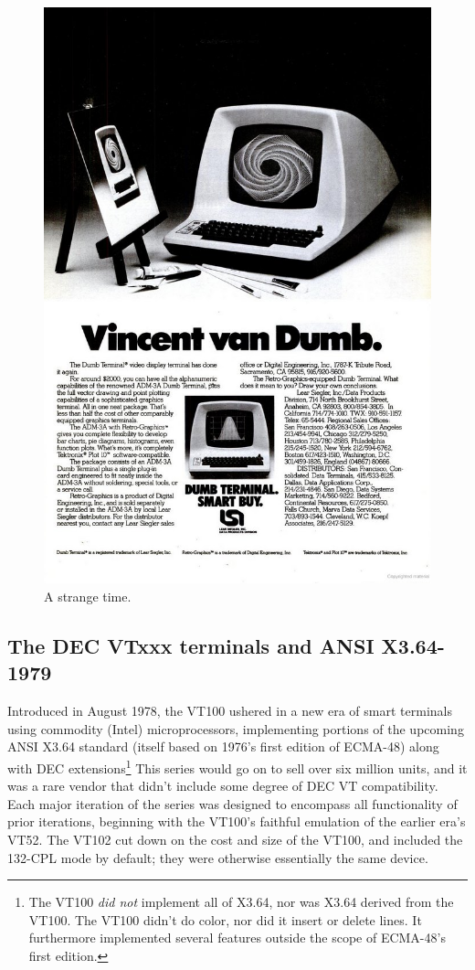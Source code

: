 \begin{figure}
  \centering
  \includegraphics[width=.8\linewidth]{media/adm3.jpeg}
  \caption{A strange time.}
  \label{fig:adm3}
\end{figure}

\subsection{The DEC VTxxx terminals and ANSI X3.64-1979}

Introduced in August 1978, the VT100 ushered in a new era of smart terminals
using commodity (Intel) microprocessors, implementing portions of the upcoming
ANSI X3.64 standard (itself based on 1976's first edition of ECMA-48) along
with DEC extensions\footnote{The VT100 \textit{did not} implement all of X3.64,
nor was X3.64 derived from the VT100. The VT100 didn't do color, nor did it
insert or delete lines. It furthermore implemented several features outside
the scope of ECMA-48's first edition.} This series would go on to sell over
six million units, and it was a rare vendor that didn't include some degree
of DEC VT compatibility. Each major iteration of the series was designed to
encompass all functionality of prior iterations, beginning with the VT100's
faithful emulation of the earlier era's VT52\cite{vt52}. The VT102 cut down on the cost
and size of the VT100, and included the 132-CPL mode by default; they were
otherwise essentially the same device\cite{vt100}.

